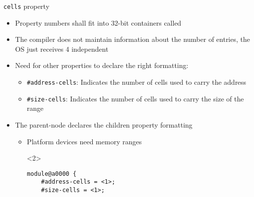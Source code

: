 \begin{frame}[fragile]{{\tt cells} property}
  \begin{itemize}
  \item Property numbers shall fit into 32-bit containers called
  \item The compiler does not maintain information about the number of
    entries, the OS just receives 4 independent 
    \begin{itemize}
    \end{itemize}
    \pause
  \item Need for other properties to declare the right formatting:
    \begin{itemize}
    \item {\tt \#address-cells}: Indicates the number of cells
      used to carry the address
    \item {\tt \#size-cells}: Indicates the number of cells
      used to carry the size of the range
    \end{itemize}
  \item The parent-node declares the children  property
    formatting
    \begin{itemize}
    \item Platform devices need memory ranges
      \begin{onlyenv}<2>
        \begin{block}{}
\begin{verbatim}
module@a0000 {
    #address-cells = <1>;
    #size-cells = <1>;


\end{verbatim}
\end{block}
\end{onlyenv}
\end{itemize}
\end{itemize}
\end{frame}
